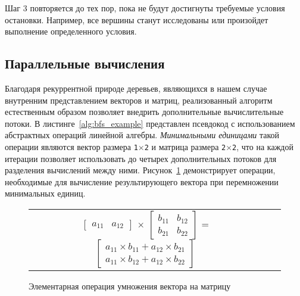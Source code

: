 \noindent Шаг 3 повторяется до тех пор, пока не будут достигнуты требуемые условия остановки. Например, все вершины станут исследованы или произойдет выполнение определенного условия.



\subsection{Параллельные вычисления}
\noindent Благодаря рекуррентной природе деревьев, являющихся в нашем случае внутренним представлением векторов и матриц, реализованный алгоритм естественным образом позволяет внедрить дополнительные вычислительные потоки. В листинге~\ref{alg:bfs_example} представлен псевдокод с использованием абстрактных операций линейной алгебры. \textit{Минимальными единицами} такой операции являются вектор размера \texttt{1$\times$2} и матрица размера \texttt{2$\times$2}, что на каждой итерации позволяет использовать до четырех дополнительных потоков для разделения вычислений между ними. Рисунок~\ref{ab_product} демонстрирует операции, необходимые для вычисление результирующего вектора при перемножении минимальных единиц. 

\begin{figure}[h]
\begin{center}
    \begin{tabular}{ccc}
        $\begin{bmatrix} a_{11} & a_{12} \end{bmatrix}$
        $\times$
        $\begin{bmatrix} b_{11} & b_{12} \\ b_{21} & b_{22} \end{bmatrix}$
        =
        $\begin{bmatrix} a_{11} \times b_{11} + a_{12} \times b_{21} \\ a_{11} \times b_{12} + a_{12} \times b_{22} \end{bmatrix}$
    \end{tabular}
\end{center}
\caption{Элементарная операция умножения вектора на матрицу}
\label{ab_product}
\end{figure}
\lstset{style=codelistingstyle}


